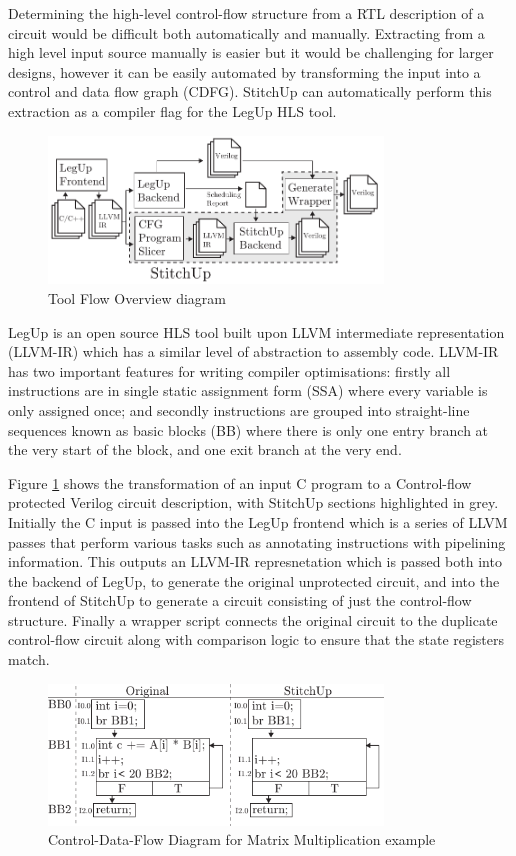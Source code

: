 Determining the high-level control-flow structure from a RTL description
of a circuit would be difficult both automatically and manually.
Extracting from a high level input source manually is easier but it would
be challenging for larger designs, however it can be easily automated by
transforming the input into a control and data flow graph (CDFG).
StitchUp can automatically perform this extraction as a compiler flag
for the LegUp HLS tool.

\begin{figure}[t]
\centering
\includegraphics[width=3.5in]{./imgs/tool-flow.pdf}
\caption{Tool Flow Overview diagram}
\label{fig:tool_flow_diagram}
\end{figure}

LegUp is an open source HLS tool built upon LLVM intermediate representation (LLVM-IR) which has
a similar level of abstraction to assembly code.
LLVM-IR has two important features for writing compiler optimisations:
firstly all instructions are in single static assignment form (SSA) where every variable is only
assigned once; and secondly instructions are grouped into straight-line sequences known as basic blocks (BB)
where there is only one entry branch at the very start of the block, and one exit branch at the very end.

Figure \ref{fig:tool_flow_diagram} shows the transformation of an input C program
to a Control-flow protected
Verilog circuit description, with StitchUp sections highlighted in grey.
Initially the C input is passed into the LegUp frontend which is
a series of LLVM passes that
perform various tasks such as annotating instructions with pipelining information.
This outputs an LLVM-IR represnetation which is passed both into the backend of LegUp,
to generate the
original unprotected circuit, and into the frontend of StitchUp to generate a circuit
consisting of just the control-flow structure.
Finally a wrapper script connects the original circuit to the duplicate control-flow circuit
along with comparison logic to ensure that the state registers match.

\begin{figure}[t]
\centering
\includegraphics[width=3.5in]{./imgs/dot_product_cdfg.pdf}
\caption{Control-Data-Flow Diagram for Matrix Multiplication example}
\label{fig:mmm_cdfg}
\end{figure}

